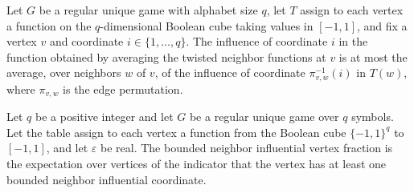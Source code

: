 \begin{theorem}
\label{FABL.RegularUniqueGame.influence_boundedAveragedNeighborFunction_le}
\leanok
{}
Let $G$ be a regular unique game with alphabet size $q$, let $T$ assign to each vertex a
function on the $q$-dimensional Boolean cube taking values in $[-1,1]$, and fix a vertex
$v$ and coordinate $i\in\{1,\ldots,q\}$. The influence of coordinate $i$ in the function
obtained by averaging the twisted neighbor functions at $v$ is at most the average, over
neighbors $w$ of $v$, of the influence of coordinate $\pi_{v,w}^{-1}(i)$ in $T(w)$,
where $\pi_{v,w}$ is the edge permutation.
\end{theorem}

\begin{definition}
\label{FABL.RegularUniqueGame.boundedNeighborInfluentialVertexFraction}
\leanok
{}
Let $q$ be a positive integer and let $G$ be a regular unique game over $q$ symbols. Let
the table assign to each vertex a function from the Boolean cube $\{−1,1\}^{q}$ to
$[-1,1]$, and let $\varepsilon$ be real. The bounded neighbor influential vertex
fraction is the expectation over vertices of the indicator that the vertex has at least
one bounded neighbor influential coordinate.
\end{definition}

